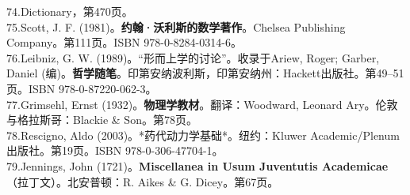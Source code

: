 74.Dictionary，第470页。\\
75.Scott, J. F. (1981)。\textbf{约翰·沃利斯的数学著作}。Chelsea Publishing Company。第111页。ISBN 978-0-8284-0314-6。\\
76.Leibniz, G. W. (1989)。“形而上学的讨论”。收录于Ariew, Roger; Garber, Daniel (编)。\textbf{哲学随笔}。印第安纳波利斯，印第安纳州：Hackett出版社。第49–51页。ISBN 978-0-87220-062-3。\\
77.Grimsehl, Ernst (1932)。\textbf{物理学教材}。翻译：Woodward, Leonard Ary。伦敦与格拉斯哥：Blackie & Son。第78页。\\
78.Rescigno, Aldo (2003)。*药代动力学基础*。纽约：Kluwer Academic/Plenum出版社。第19页。ISBN 978-0-306-47704-1。\\
79.Jennings, John (1721)。\textbf{Miscellanea in Usum Juventutis Academicae}（拉丁文）。北安普顿：R. Aikes & G. Dicey。第67页。